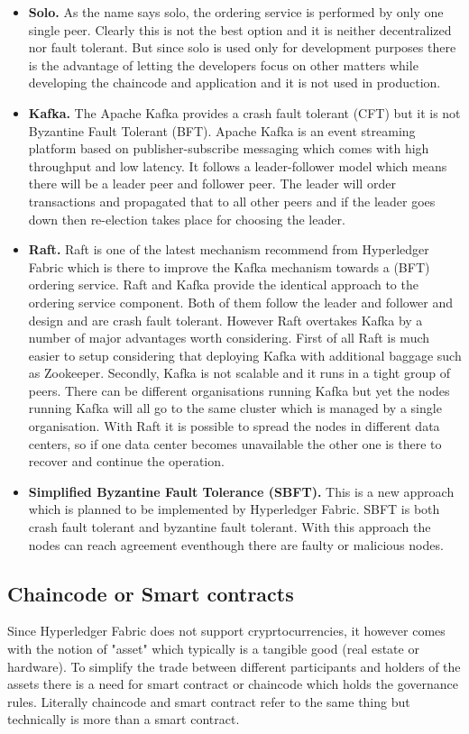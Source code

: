 \begin{itemize}
  \item \textbf{Solo.}  As the name says solo, the ordering service is performed by only one single peer. Clearly this is not the best option and it is neither decentralized  nor fault tolerant. But since solo is used only for development purposes there is the advantage of letting the developers focus on other matters while developing the chaincode and application and it is not used in production. 
 \item \textbf{Kafka.} The Apache Kafka provides a crash fault tolerant (CFT) but it is not Byzantine Fault Tolerant (BFT). Apache Kafka is an event streaming platform based on publisher-subscribe messaging which comes with high throughput and low latency. It follows a leader-follower model which means there will be a leader peer and follower peer. The leader will order transactions and propagated that to all other peers and if the leader goes down then re-election takes place for choosing the leader. 
 \item \textbf{Raft.} Raft is one of the latest mechanism recommend from Hyperledger Fabric which is there to improve the Kafka mechanism towards a (BFT) ordering service. Raft and Kafka provide the identical approach to the ordering service component. Both of them follow the leader and follower and design and are crash fault tolerant. However Raft overtakes Kafka by a number of major advantages worth considering. First of all Raft is much easier to setup considering that deploying Kafka with additional baggage such as Zookeeper. Secondly, Kafka is not scalable and it runs in a tight group of peers. There can be different organisations running Kafka but yet the nodes running Kafka will all go to the same cluster which is managed by a single organisation. With Raft it is possible to spread the nodes in different data centers, so if one data center becomes unavailable the other one is there to recover and continue the operation.

 
 \item \textbf{Simplified Byzantine Fault Tolerance (SBFT).} This is a new approach which is planned to be implemented by Hyperledger Fabric. SBFT is both crash fault tolerant and byzantine fault tolerant. With this approach the nodes can reach agreement eventhough there are faulty or malicious nodes. 
\end{itemize}

\subsection{Chaincode or Smart contracts}
Since Hyperledger Fabric does not support cryprtocurrencies, it however comes with the notion of "asset" which typically is a tangible good (real estate or hardware). To simplify the trade between different participants and holders of the assets there is a need for smart contract or chaincode which holds the governance rules. Literally chaincode and smart contract refer to the same thing but technically is more than a smart contract. 

